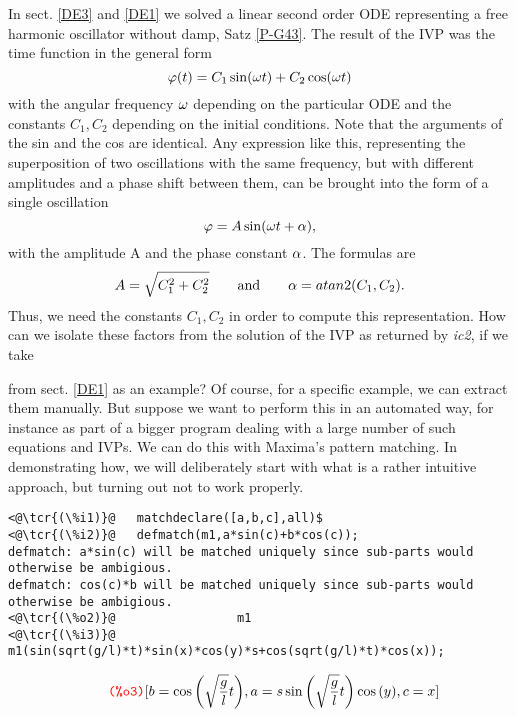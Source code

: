 \documentclass[../Maxima_Workbook.tex]{subfiles}
\begin{document}
In sect. \ref{DE3} and \ref{DE1} we solved a linear second order ODE representing a free harmonic oscillator without damp, Satz \ref{P-G43}. The result of the IVP was the time function in the general form
\begin{equation}\label{RP4}
	\varphi(t)= C_1 \sin(\omega t)+C_2 \cos(\omega t)
\end{equation}
with the angular frequency $ \omega $ depending on the particular ODE and the constants $ C_1, C_2 $ depending on the initial conditions. Note that the arguments of the sin and the cos are identical. Any expression like this, representing the superposition of two oscillations with the same frequency, but with different amplitudes and a phase shift between them, can be brought into the form of a single oscillation
\begin{equation}\label{RP4a}
	\varphi = A \sin (\omega t + \alpha),
\end{equation}
with the amplitude A and the phase constant $ \alpha $. The formulas are
\begin{equation}\label{RP4b}
	A = \sqrt{C_1^2+C_2^2} \qquad \text{and} \qquad \alpha = atan2 (C_1,C_2).	
\end{equation}
Thus, we need the constants $ C_1, C_2 $ in order to compute this representation. How can we isolate these factors from the solution of the IVP as returned by \emph{ic2}, if we take \begin{small}\end{small} from sect. \ref{DE1} as an example? Of course, for a specific example, we can extract them manually. But suppose we want to perform this in an automated way, for instance as part of a bigger program dealing with a large number of such equations and IVPs. We can do this with Maxima's pattern matching. In demonstrating how, we will deliberately start with what is a rather intuitive approach, but turning out not to work properly.

\lz \begin{small}
\color{blue} \leqn
\begin{lstlisting}
<@\tcr{(\%i1)}@   matchdeclare([a,b,c],all)$
<@\tcr{(\%i2)}@   defmatch(m1,a*sin(c)+b*cos(c));
defmatch: a*sin(c) will be matched uniquely since sub-parts would otherwise be ambigious.
defmatch: cos(c)*b will be matched uniquely since sub-parts would otherwise be ambigious.
<@\tcr{(\%o2)}@			        m1
<@\tcr{(\%i3)}@   m1(sin(sqrt(g/l)*t)*sin(x)*cos(y)*s+cos(sqrt(g/l)*t)*cos(x));
\end{lstlisting}
\vspace{-4mm} \[\tag*{\tcr{\ttfamily (\%o3)}} [b=\cos{\left( \sqrt{\frac{g}{l}} t\right) },a=s \sin{\left( \sqrt{\frac{g}{l}} t\right) } \cos{(y)},c=x] \]
\color{black} \reqn
\end{small} \vspace{-4mm}
\end{document}
